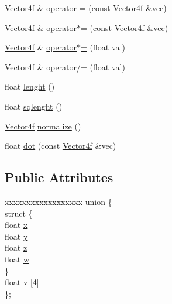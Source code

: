 \begin{DoxyCompactItemize}
\item 
\hyperlink{classh2_1_1_vector4f}{Vector4f} \& \hyperlink{classh2_1_1_vector4f_af87f23b274e75556f7862e88f2c8216b}{operator-\/=} (const \hyperlink{classh2_1_1_vector4f}{Vector4f} \&vec)
\item 
\hyperlink{classh2_1_1_vector4f}{Vector4f} \& \hyperlink{classh2_1_1_vector4f_a5f1d73f80aa0a4df074915724ecf36ec}{operator$\ast$=} (const \hyperlink{classh2_1_1_vector4f}{Vector4f} \&vec)
\item 
\hyperlink{classh2_1_1_vector4f}{Vector4f} \& \hyperlink{classh2_1_1_vector4f_a5acca7cc4284a403be9ac6a90c696331}{operator$\ast$=} (float val)
\item 
\hyperlink{classh2_1_1_vector4f}{Vector4f} \& \hyperlink{classh2_1_1_vector4f_ab55409ed8db7430db11a378a2afcd081}{operator/=} (float val)
\item 
float \hyperlink{classh2_1_1_vector4f_ae6265102db6a9cc64af101135ab82c80}{lenght} ()
\item 
float \hyperlink{classh2_1_1_vector4f_acf0093ef3638e8aa048d7dd6031383be}{sqlenght} ()
\item 
\hyperlink{classh2_1_1_vector4f}{Vector4f} \hyperlink{classh2_1_1_vector4f_a4b155e8ad71df85753c177af592e0dbc}{normalize} ()
\item 
float \hyperlink{classh2_1_1_vector4f_a6283d84f9916da4f4935e709426bac94}{dot} (const \hyperlink{classh2_1_1_vector4f}{Vector4f} \&vec)
\end{DoxyCompactItemize}
\subsection*{Public Attributes}
\begin{DoxyCompactItemize}
\item 
\begin{tabbing}
xx\=xx\=xx\=xx\=xx\=xx\=xx\=xx\=xx\=\kill
union \{\\
\>struct \{\\
\>\>float \hyperlink{classh2_1_1_vector4f_adac3565214ca8c155656652eb63de199}{x}\\
\>\>float \hyperlink{classh2_1_1_vector4f_a55b852da5da18182eade72cc31a24c07}{y}\\
\>\>float \hyperlink{classh2_1_1_vector4f_a537a0df644f481fc056c92d484644dcd}{z}\\
\>\>float \hyperlink{classh2_1_1_vector4f_aa59d06bc0affb9f4fa5c559ccd834bca}{w}\\
\>\} \\
\>float \hyperlink{classh2_1_1_vector4f_a8d4487c739f8e98225f89f50274b92cc}{v} \mbox{[}4\mbox{]}\\
\}; \\

\end{tabbing}\end{DoxyCompactItemize}

